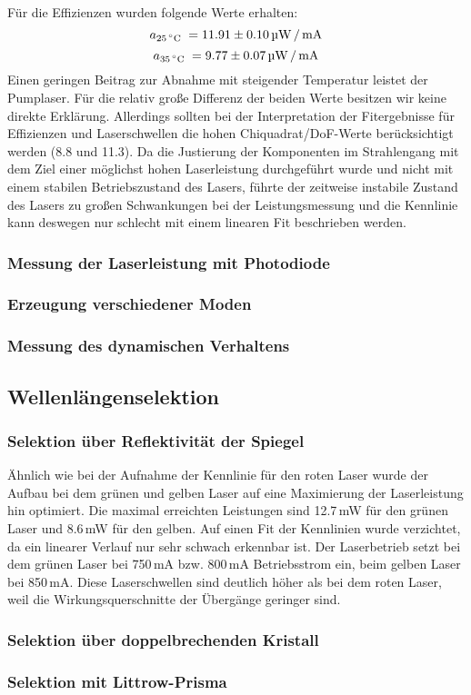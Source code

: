Für die Effizienzen wurden folgende Werte erhalten:
\begin{equation*}
a_{25\text{\grad}} = 11.91\pm0.10\,\text{\textmu W\,/\,mA}
\end{equation*}
\begin{equation*}
a_{35\text{\grad}} = 9.77\pm0.07\,\text{\textmu W\,/\,mA}
\end{equation*}
Einen geringen Beitrag zur Abnahme mit steigender Temperatur leistet der Pumplaser.
Für die relativ große Differenz der beiden Werte besitzen wir keine direkte Erklärung.
Allerdings sollten bei der Interpretation der Fitergebnisse für Effizienzen und
Laserschwellen die hohen Chiquadrat/DoF-Werte berücksichtigt werden (8.8 und 11.3).
Da die Justierung der Komponenten im Strahlengang mit dem Ziel einer möglichst hohen Laserleistung
durchgeführt wurde und nicht mit einem stabilen Betriebszustand des Lasers,
führte der zeitweise instabile Zustand des Lasers zu großen Schwankungen bei der Leistungsmessung
und die Kennlinie kann deswegen nur schlecht mit einem linearen Fit beschrieben werden.


\subsubsection{Messung der Laserleistung mit Photodiode}



\subsubsection{Erzeugung verschiedener Moden}


\subsubsection{Messung des dynamischen Verhaltens}


\subsection{Wellenlängenselektion}

\subsubsection{Selektion über Reflektivität der Spiegel}

Ähnlich wie bei der Aufnahme der Kennlinie für den roten Laser wurde der Aufbau bei dem grünen und
gelben Laser auf eine Maximierung der Laserleistung hin optimiert.
Die maximal erreichten Leistungen sind 12.7\,mW für den grünen Laser und 8.6\,mW für den gelben.
Auf einen Fit der Kennlinien wurde verzichtet,
da ein linearer Verlauf nur sehr schwach erkennbar ist.
Der Laserbetrieb setzt bei dem grünen Laser bei 750\,mA bzw. 800\,mA Betriebsstrom ein,
beim gelben Laser bei 850\,mA.
Diese Laserschwellen sind deutlich höher als bei dem roten Laser,
weil die Wirkungsquerschnitte der Übergänge geringer sind.

\subsubsection{Selektion über doppelbrechenden Kristall}

\subsubsection{Selektion mit Littrow-Prisma}
